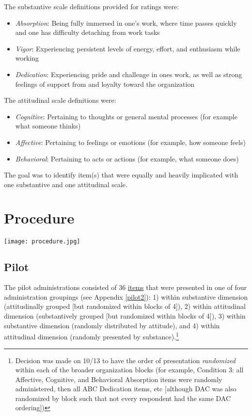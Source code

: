 \documentclass[
]{book}
\providecommand{\tightlist}{%
  \setlength{\itemsep}{0pt}\setlength{\parskip}{0pt}}
\begin{document}
The substantive scale definitions provided for ratings were:

\begin{itemize}
\tightlist
\item
  \emph{Absorption}: Being fully immersed in one's work, where time passes quickly and one has difficulty detaching from work tasks
\item
  \emph{Vigor}: Experiencing persistent levels of energy, effort, and enthusiasm while working
\item
  \emph{Dedication}: Experiencing pride and challenge in ones work, as well as strong feelings of support from and loyalty toward the organization
\end{itemize}

The attitudinal scale definitions were:

\begin{itemize}
\tightlist
\item
  \emph{Cognitive}: Pertaining to thoughts or general mental processes (for example what someone thinks)
\item
  \emph{Affective}: Pertaining to feelings or emotions (for example, how someone feels)
\item
  \emph{Behavioral}: Pertaining to acts or actions (for example, what someone does)
\end{itemize}

The goal was to identify item(s) that were equally and heavily implicated with one substantive and one attitudinal scale.

\hypertarget{procedure}{%
\chapter{Procedure}\label{procedure}}

\texttt{[image: procedure.jpg]}

\hypertarget{conds}{%
\section{Pilot}\label{conds}}

The pilot administrations consisted of 36 \href{https://docs.google.com/document/d/18KYE7jq8XLhN-mfGQRMnkf5AM-_U2CJck50eISbAiwM/edit?usp=sharing}{items} that were presented in one of four administration groupings (see Appendix \ref{pilot2}): 1) within substantive dimension (attitudinally grouped {[}but randomized within blocks of 4{]}), 2) within attitudinal dimension (substantively grouped {[}but randomized within blocks of 4{]}), 3) within substantive dimension (randomly distributed by attitude), and 4) within attitudinal dimension (randomly presented by substance).\footnote{Decision was made on 10/13 to have the order of presentation \emph{randomized} within each of the broader organization blocks (for example, Condition 3: all Affective, Cognitive, and Behavioral Absorption items were randomly administered, then all ABC Dedication items, etc {[}although DAC was also randomized by block such that not every respondent had the same DAC ordering{]})}
\end{document}
